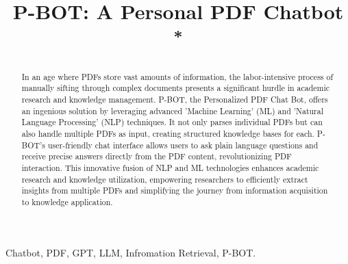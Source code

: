 \documentclass[conference]{IEEEtran}
\begin{document}
\title{P-BOT: A Personal PDF Chatbot\\
{\footnotesize \textsuperscript{*}}
}

\author{
\and
{}
\and
{}
\and
{}
}

\maketitle

\begin{abstract}
In an age where PDFs store vast amounts of information, the labor-intensive process of manually sifting through complex documents presents a significant hurdle in academic research and knowledge management. P-BOT, the Personalized PDF Chat Bot, offers an ingenious solution by leveraging advanced 'Machine Learning' (ML) and 'Natural Language Processing' (NLP) techniques. It not only parses individual PDFs but can also handle multiple PDFs as input, creating structured knowledge bases for each. P-BOT's user-friendly chat interface allows users to ask plain language questions and receive precise answers directly from the PDF content, revolutionizing PDF interaction. This innovative fusion of NLP and ML technologies enhances academic research and knowledge utilization, empowering researchers to efficiently extract insights from multiple PDFs and simplifying the journey from information acquisition to knowledge application.
\end{abstract}
\baselineskip
\begin{IEEEkeywords}
Chatbot, PDF, GPT, LLM, Infromation Retrieval, P-BOT.
\end{IEEEkeywords}
\end{document}
